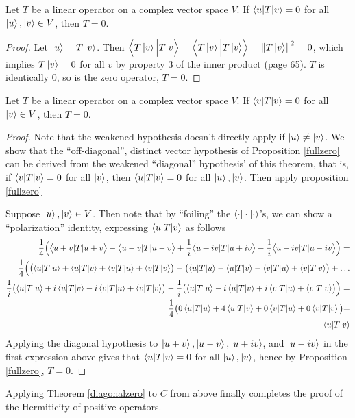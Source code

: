 \begin{prop} \label{fullzero}
	Let $T$ be a linear operator on a complex vector space $V$. If $\braket{u | T | v } = 0$ for all $\ket{u}, \ket{v} \in V$, then $T = 0$.
\end{prop}
\begin{proof}
	Let $\ket{u} = T\ket{v}$. Then $\Bigl\langle T\ket{v} \Big\vert T | v \Bigr\rangle = \Bigl\langle T\ket{v} \Big\vert  T\ket{v} \Bigr\rangle = \left\lVert T\ket{v}\right\rVert^2 = 0$, which implies $T\ket{v} = 0$ for all $v$ by property 3 of the inner product (page 65).  $T$ is identically 0, so is the zero operator,  $T = 0$.
\end{proof}
\begin{thm}\label{diagonalzero}
	Let $T$ be a linear operator on a complex vector space $V$. If $\braket{v | T | v } = 0$ for all $\ket{v} \in V$, then $T = 0$.
\end{thm}
\begin{proof}
Note that the weakened hypothesis doesn't directly apply if $\ket{u} \neq \ket{v}$.  We show that the ``off-diagonal'', distinct vector hypothesis of Proposition \ref{fullzero} can be derived from the weakened ``diagonal'' hypothesis' of this theorem, that is, if $\braket{v | T | v } = 0$ for all $\ket{v}$, then $\braket{u | T | v } = 0$ for all $\ket{u},\ket{v}$. Then apply proposition \ref{fullzero}

Suppose $\ket{u}, \ket{v} \in V$. Then note that by ``foiling'' the $\braket{\cdot|\cdot|\cdot}$'s, we can show a ``polarization'' identity, expressing $\braket{u|T|v}$ as follows
	\begin{align*}
		\frac{1}{4} \Bigl( \bigl\langle u+v|T|u+v\bigr\rangle - \bigl\langle u-v|T|u-v\bigr\rangle + \frac{1}{i}\bigl\langle u+iv|T|u+iv\bigr\rangle -\frac{1}{i} \bigl\langle u-iv|T|u-iv\bigr\rangle \Bigr) = \\
		\frac{1}{4}\Bigl( \bigl(\braket{u|T|u} + \braket{u|T|v} + \braket{v|T|u} + \braket{v|T|v}\bigr) - \bigl(\braket{u|T|u} - \braket{u|T|v} - \braket{v|T|u} + \braket{v|T|v}\bigr) + \dots \\
		  \frac{1}{i}\bigl(\braket{u|T|u}+ i\braket{u|T|v}- i\braket{v|T|u}+ \braket{v|T|v}\bigr) -  \frac{1}{i}\bigl(\braket{u|T|u}- i\braket{u|T|v}+ i\braket{v|T|u} + \braket{v|T|v}\bigr)\Bigr) = \\
		\frac{1}{4}\bigr(0\braket{u|T|u} + 4\braket{u|T|v} + 0 \braket{v|T|u} + 0\braket{v|T|v}\bigl) = \\
		\braket{u|T|v} 
	\end{align*}
	Applying the diagonal hypothesis to $\ket{u+v}, \ket{u-v}, \ket{u+iv}$, and $\ket{u-iv}$ in the first expression above gives that $\braket{u|T|v} = 0$ for all $\ket{u},\ket{v}$, hence by Proposition \ref{fullzero}, $T = 0$.
\end{proof}
Applying Theorem \ref{diagonalzero} to $C$ from above finally completes the proof of the Hermiticity of positive operators.

